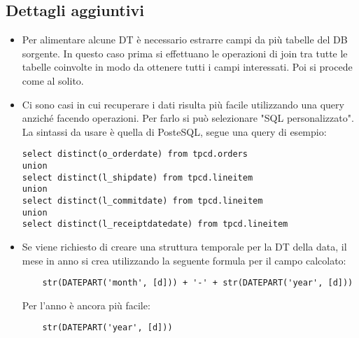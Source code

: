 \subsection{Dettagli aggiuntivi}
\begin{itemize}
	\item Per alimentare alcune DT è necessario estrarre campi da più tabelle del DB sorgente. In questo caso prima si effettuano le operazioni di join tra tutte le tabelle coinvolte in modo da ottenere tutti i campi interessati. Poi si procede come al solito.
	\item Ci sono casi in cui recuperare i dati risulta più facile utilizzando una query anziché facendo operazioni. Per farlo si può selezionare "SQL personalizzato". La sintassi da usare è quella di PosteSQL, segue una query di esempio:
	\begin{verbatim}
select distinct(o_orderdate) from tpcd.orders
union
select distinct(l_shipdate) from tpcd.lineitem
union
select distinct(l_commitdate) from tpcd.lineitem
union
select distinct(l_receiptdatedate) from tpcd.lineitem
	\end{verbatim}
	\item Se viene richiesto di creare una struttura temporale per la DT della data, il mese in anno si crea utilizzando la seguente formula per il campo calcolato:
	\begin{verbatim}
	str(DATEPART('month', [d])) + '-' + str(DATEPART('year', [d]))
	\end{verbatim}
	Per l'anno è  ancora più facile:
	\begin{verbatim}
	str(DATEPART('year', [d]))
	\end{verbatim}
\end{itemize}
\newpage
